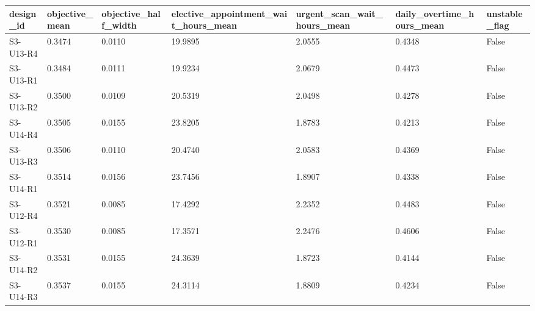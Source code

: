 \begin{tabular}{lllllll}
\toprule
design\_id & objective\_mean & objective\_half\_width & elective\_appointment\_wait\_hours\_mean & urgent\_scan\_wait\_hours\_mean & daily\_overtime\_hours\_mean & unstable\_flag \\
\midrule
S3-U13-R4 & 0.3474 & 0.0110 & 19.9895 & 2.0555 & 0.4348 & False \\
S3-U13-R1 & 0.3484 & 0.0111 & 19.9234 & 2.0679 & 0.4473 & False \\
S3-U13-R2 & 0.3500 & 0.0109 & 20.5319 & 2.0498 & 0.4278 & False \\
S3-U14-R4 & 0.3505 & 0.0155 & 23.8205 & 1.8783 & 0.4213 & False \\
S3-U13-R3 & 0.3506 & 0.0110 & 20.4740 & 2.0583 & 0.4369 & False \\
S3-U14-R1 & 0.3514 & 0.0156 & 23.7456 & 1.8907 & 0.4338 & False \\
S3-U12-R4 & 0.3521 & 0.0085 & 17.4292 & 2.2352 & 0.4483 & False \\
S3-U12-R1 & 0.3530 & 0.0085 & 17.3571 & 2.2476 & 0.4606 & False \\
S3-U14-R2 & 0.3531 & 0.0155 & 24.3639 & 1.8723 & 0.4144 & False \\
S3-U14-R3 & 0.3537 & 0.0155 & 24.3114 & 1.8809 & 0.4234 & False \\
\bottomrule
\end{tabular}
